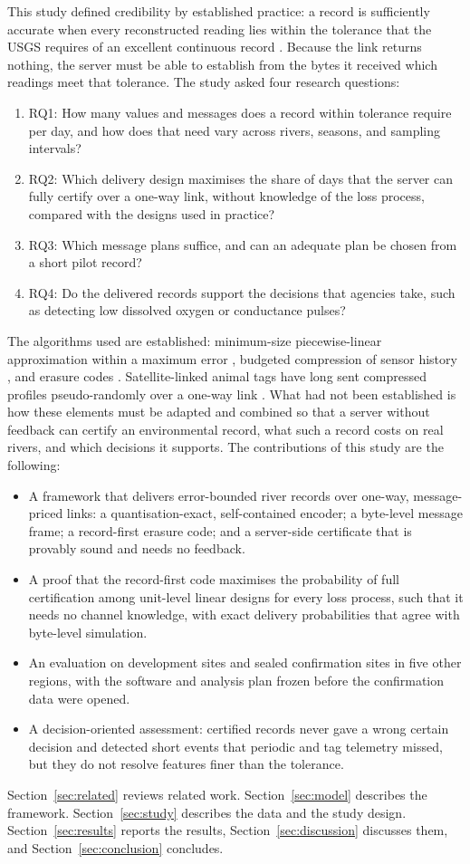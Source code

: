 This study defined credibility by established practice: a record is sufficiently accurate when every reconstructed reading lies within the tolerance that the USGS requires of an excellent continuous record \citep{wagner2006}. Because the link returns nothing, the server must be able to establish from the bytes it received which readings meet that tolerance. The study asked four research questions:
\begin{enumerate}
  \item RQ1: How many values and messages does a record within tolerance require per day, and how does that need vary across rivers, seasons, and sampling intervals?
  \item RQ2: Which delivery design maximises the share of days that the server can fully certify over a one-way link, without knowledge of the loss process, compared with the designs used in practice?
  \item RQ3: Which message plans suffice, and can an adequate plan be chosen from a short pilot record?
  \item RQ4: Do the delivered records support the decisions that agencies take, such as detecting low dissolved oxygen or conductance pulses?
\end{enumerate}

The algorithms used are established: minimum-size piecewise-linear approximation within a maximum error \citep{imai1988}, budgeted compression of sensor history \citep{deligiannakis2007}, and erasure codes \citep{reed1960}. Satellite-linked animal tags have long sent compressed profiles pseudo-randomly over a one-way link \citep{boehme2009,photopoulou2015}. What had not been established is how these elements must be adapted and combined so that a server without feedback can certify an environmental record, what such a record costs on real rivers, and which decisions it supports. The contributions of this study are the following:
\begin{itemize}
  \item A framework that delivers error-bounded river records over one-way, message-priced links: a quantisation-exact, self-contained encoder; a byte-level message frame; a record-first erasure code; and a server-side certificate that is provably sound and needs no feedback.
  \item A proof that the record-first code maximises the probability of full certification among unit-level linear designs for every loss process, such that it needs no channel knowledge, with exact delivery probabilities that agree with byte-level simulation.
  \item An evaluation on \nSitesDev{} development sites and \nSitesConf{} sealed confirmation sites in five other regions, with the software and analysis plan frozen before the confirmation data were opened.
  \item A decision-oriented assessment: certified records never gave a wrong certain decision and detected short events that periodic and tag telemetry missed, but they do not resolve features finer than the tolerance.
\end{itemize}

Section~\ref{sec:related} reviews related work. Section~\ref{sec:model} describes the framework. Section~\ref{sec:study} describes the data and the study design. Section~\ref{sec:results} reports the results, Section~\ref{sec:discussion} discusses them, and Section~\ref{sec:conclusion} concludes.
